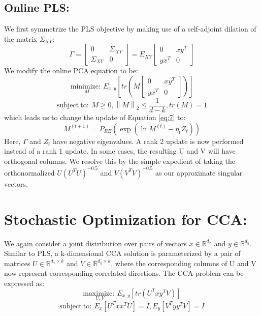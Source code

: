 \documentclass{article}
\begin{document}
\subsection{Online PLS:}
We first symmetrize the PLS objective by making use of a self-adjoint dilation of the matrix $\Sigma_{XY}$:
\begin{equation}
    \Gamma =\begin{bmatrix}
0 & \Sigma _{XY} \\
\Sigma _{XY} & 0
\end{bmatrix}=E_{XY}\begin{bmatrix}
0 & xy^{T} \\
yx^{T} & 0
\end{bmatrix}
\end{equation}
We modify the online PCA equation to be:
\begin{equation}
\underset{M}{\mathrm{minimize :\ }}E_{x,y}\left[ tr\left( M\begin{bmatrix}
0 & xy^{T} \\
yx^{T} & 0
\end{bmatrix}\right) \right]  
\end{equation}
\begin{equation}
\mathrm{subject\ to :\ }M\geq 0,\left\| M\right\| _{2}\leq \dfrac {1}{d-k},tr\left( M\right) =1
\end{equation}
which leads us to change the update of Equation \ref{eq:7} to:
\begin{equation}
    M^{\left( t+1\right) }=P_{RE}\left( \exp \left( \ln M^{\left( t\right) }-\eta _{t}Z_{t}\right) \right) 
\end{equation}
Here, $\Gamma$ and $Z_{t}$ have negative eigenvalues. A rank 2 update is now performed instead of a rank 1 update. In some cases, the resulting U and V will have orthogonal columns. We resolve this by the simple expedient of taking the orthonormalized $U\left( U^{T}U\right) ^{-0.5}$ and $V\left( V^{T}V\right) ^{-0.5}$ as our approximate singular vectors.

\section{Stochastic Optimization for CCA:}
We again consider a joint distribution over pairs of vectors $x\in \mathbb{R} ^{d_{x}}$ and $y\in \mathbb{R} ^{d_{y}}$. Similar to PLS, a k-dimensional CCA solution is parameterized by a pair of matrices $U\in \mathbb{R} ^{d_{x}\times k}$ and $V\in \mathbb{R} ^{d_{y}\times k}$, where the corresponding columns of U and V now represent corresponding correlated directions. The CCA problem can be expressed as:
\begin{equation}
\underset{U,V}{\mathrm{maximize :\ }}E_{x,y}\left[ tr\left( U^{T}xy^{T}V\right) \right] 
\end{equation}
\begin{equation}
\mathrm{subject\ to :\ }E_{x}\left[ U^{T}xx^{T}U\right] =I,E_{y}\left[ V^{T}yy^{T}V\right] =I
\end{equation}
\end{document}
